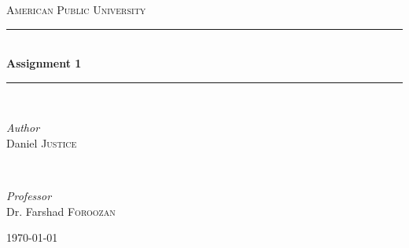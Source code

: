 \documentclass[11pt]{article}
\begin{document}

\begin{titlepage} %
	\newcommand{\HRule}{\rule{\linewidth}{0.5mm}} %

	\center %


	\textsc{\LARGE American Public University}\\[1.5cm] %


	\HRule\\[0.4cm]

	{\huge\bfseries Assignment 1}\\[0.4cm] %

	\HRule\\[1.5cm]


	\begin{minipage}{0.4\textwidth}
		\begin{flushleft}
			\large
			\textit{Author}\\
			Daniel \textsc{Justice} %
		\end{flushleft}
	\end{minipage}
	~
	\begin{minipage}{0.4\textwidth}
		\begin{flushright}
			\large
			\textit{Professor}\\
			Dr. Farshad \textsc{Foroozan} %
		\end{flushright}
	\end{minipage}


	\vfill\vfill\vfill
	{\large\today} %
	\vfill

\end{titlepage}
\end{document}
